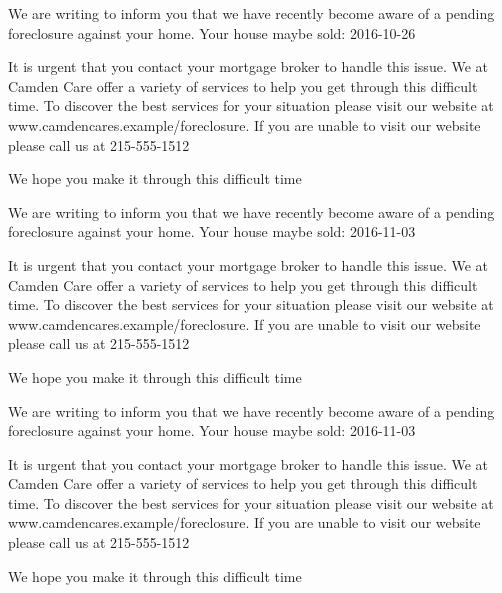 \documentclass[10pt,stdletter]{newlfm}
\begin{document}
\begin{newlfm}

We are writing to inform you that we have recently become aware of a pending foreclosure against your home. Your house maybe sold: 2016-10-26

It is urgent that you contact your mortgage broker to handle this issue.
We at Camden Care offer a variety of services to help you get through this difficult time. To discover the best services for your situation please visit our website at www.camdencares.example/foreclosure.
If you are unable to visit our website please call us at 215-555-1512

We hope you make it through this difficult time

\end{newlfm}
\pagebreak
{}
\begin{newlfm}

We are writing to inform you that we have recently become aware of a pending foreclosure against your home. Your house maybe sold: 2016-11-03

It is urgent that you contact your mortgage broker to handle this issue.
We at Camden Care offer a variety of services to help you get through this difficult time. To discover the best services for your situation please visit our website at www.camdencares.example/foreclosure.
If you are unable to visit our website please call us at 215-555-1512

We hope you make it through this difficult time

\end{newlfm}
\pagebreak
{}
\begin{newlfm}

We are writing to inform you that we have recently become aware of a pending foreclosure against your home. Your house maybe sold: 2016-11-03

It is urgent that you contact your mortgage broker to handle this issue.
We at Camden Care offer a variety of services to help you get through this difficult time. To discover the best services for your situation please visit our website at www.camdencares.example/foreclosure.
If you are unable to visit our website please call us at 215-555-1512

We hope you make it through this difficult time

\end{newlfm}
\end{document}
